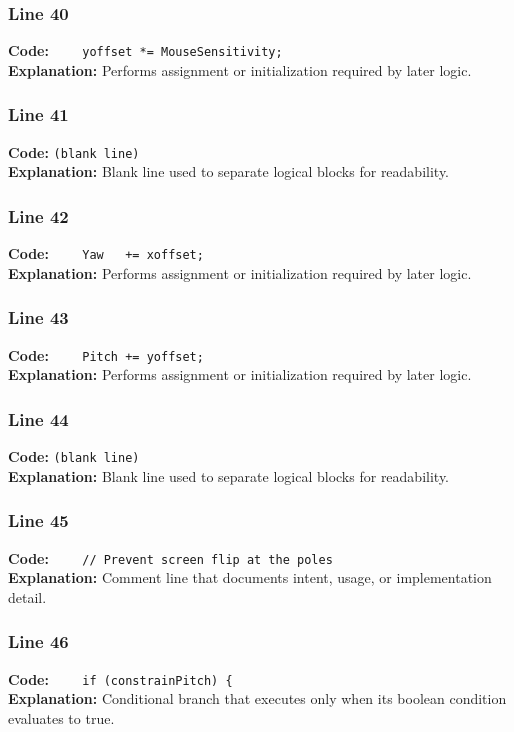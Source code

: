 \documentclass[11pt,a4paper]{article}
\begin{document}
\subsubsection*{Line 40}
\textbf{Code:} \verb|    yoffset *= MouseSensitivity;|\\
\textbf{Explanation:} Performs assignment or initialization required by later logic.

\subsubsection*{Line 41}
\textbf{Code:} \texttt{(blank line)}\\
\textbf{Explanation:} Blank line used to separate logical blocks for readability.

\subsubsection*{Line 42}
\textbf{Code:} \verb|    Yaw   += xoffset;|\\
\textbf{Explanation:} Performs assignment or initialization required by later logic.

\subsubsection*{Line 43}
\textbf{Code:} \verb|    Pitch += yoffset;|\\
\textbf{Explanation:} Performs assignment or initialization required by later logic.

\subsubsection*{Line 44}
\textbf{Code:} \texttt{(blank line)}\\
\textbf{Explanation:} Blank line used to separate logical blocks for readability.

\subsubsection*{Line 45}
\textbf{Code:} \verb|    // Prevent screen flip at the poles|\\
\textbf{Explanation:} Comment line that documents intent, usage, or implementation detail.

\subsubsection*{Line 46}
\textbf{Code:} \verb|    if (constrainPitch) {|\\
\textbf{Explanation:} Conditional branch that executes only when its boolean condition evaluates to true.
\end{document}
